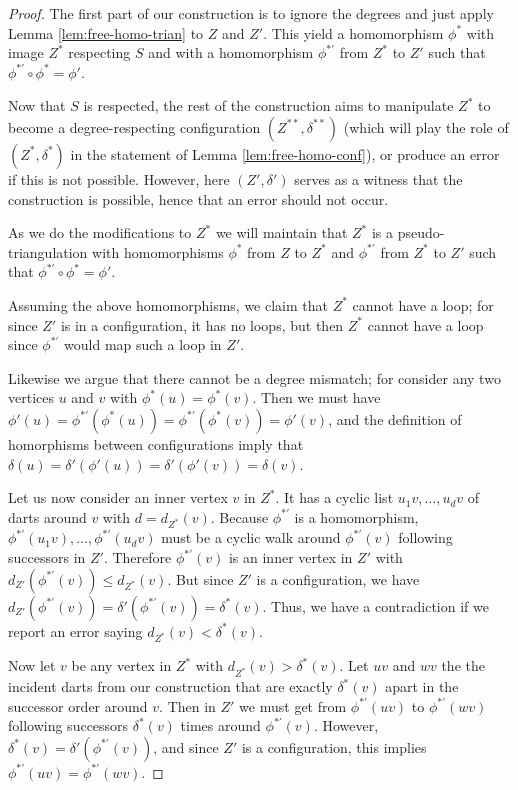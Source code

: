 \documentclass[10pt,a4paper]{article}
\begin{document}
\begin{proof}
The first part of our construction is to ignore the degrees and just apply Lemma \ref{lem:free-homo-trian} to $Z$ and $Z'$. This yield a homomorphism $\phi^*$ with  image $Z^*$ respecting $S$ and with a homomorphism $\phi^{*\prime}$ from 
$Z^*$ to $Z'$ such that
$\phi^{*\prime}\circ\phi^*=\phi'$.

Now that $S$ is respected, the rest of the construction
aims to manipulate $Z^*$ to become a degree-respecting configuration 
$(Z^{**},\delta^{**})$ (which will play the role of $(Z^*,\delta^*)$ in the statement of Lemma \ref{lem:free-homo-conf}), 
or produce an error if this is not possible. However, here $(Z',\delta')$ serves as a witness that the construction is possible, hence that an error should not occur.

As we do the modifications to $Z^*$
we will maintain that $Z^*$
is a pseudo-triangulation with homomorphisms $\phi^*$ from $Z$ to $Z^*$ and $\phi^{*\prime}$ from $Z^*$ to $Z'$ such that
$\phi^{*\prime}\circ \phi^*=\phi'$.

Assuming the above homomorphisms, we claim that  $Z^*$ cannot have a loop; for since $Z'$ is in a configuration, it has no loops, but then $Z^*$ cannot have a loop
since $\phi^{*\prime}$ would map such a loop in $Z'$.

Likewise we argue that there cannot be a degree mismatch; for consider
any two vertices $u$ and $v$ with $\phi^*(u)=\phi^*(v)$. Then we must
have $\phi'(u)=
\phi^{*\prime}(\phi^*(u))=
\phi^{*\prime}(\phi^*(v))=\phi'(v)$, and the definition of homorphisms between configurations imply that 
$\delta(u)=\delta'(\phi'(u))=\delta'(\phi'(v))=\delta(v)$.


Let us now consider an inner vertex $v$ in 
$Z^*$. It has a cyclic list $u_1v,\ldots,u_dv$ of darts around $v$ with
$d=d_{Z^*}(v)$. Because $\phi^{*\prime}$ is a homomorphism, $\phi^{*\prime}(u_1v),\ldots,\phi^{*\prime}(u_dv)$ must be a cyclic walk around $\phi^{*\prime}(v)$ following successors in $Z'$. Therefore $\phi^{*\prime}(v)$ is an inner vertex in $Z'$ with $d_{Z'}(\phi^{*\prime}(v))\leq d_{Z^*}(v)$. But since $Z'$ is a configuration, we have $d_{Z'}(\phi^{*\prime}(v))=\delta'(\phi^{*\prime}(v))=\delta^*(v)$. Thus, we have a contradiction 
if we report an
error saying $d_{Z^*}(v)<\delta^*(v)$.

Now let $v$ be any vertex in 
$Z^*$ with $d_{Z^*}(v)>\delta^*(v)$. Let $uv$ and $wv$ the the incident darts from our construction that are exactly $\delta^*(v)$ apart in the successor order around $v$.
Then in $Z'$ we must get from $\phi^{*\prime}(uv)$ to $\phi^{*\prime}(wv)$
following successors $\delta^*(v)$ times around $\phi^{*\prime}(v)$. However, $\delta^*(v)=\delta'(\phi^{*\prime}(v))$, and since $Z'$ is a configuration, this implies  $\phi^{*\prime}(uv)=\phi^{*\prime}(wv)$.


\end{proof}
\end{document}
